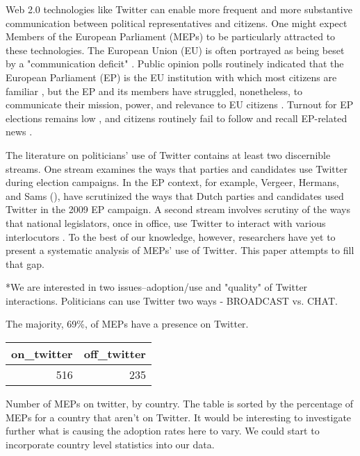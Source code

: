 \documentclass{article}\usepackage[]{graphicx}\usepackage[]{color}
\begin{document}
Web 2.0 technologies like Twitter can enable more frequent and more substantive communication between political representatives and citizens. One might expect Members of the European Parliament (MEPs) to be particularly attracted to these technologies. The European Union (EU) is often portrayed as being beset by a "communication deficit" \citep*{meyer.1999}.  Public opinion polls routinely indicated that the European Parliament (EP) is the EU institution with which most citizens are familiar \cite[e.g.,]{eurobarometer.2014}, but the EP and its members have struggled, nonetheless, to communicate their mission, power, and relevance to EU citizens \citep*{anderson.mcleod.2004}. Turnout for EP elections remains low \citep*{hobolt.2014, franklin.hobolt.2011, mattila.2013}, and citizens routinely fail to follow and recall EP-related news \citep*{eurobarometer.2013}.

The literature on politicians' use of Twitter contains at least two discernible streams. One stream examines the ways that parties and candidates use Twitter during election campaigns. In the EP context, for example, Vergeer, Hermans, and Sams (\citeyear{vergeer.hermans.sams.2011,vergeer.hermans.sams.2013}), have scrutinized the ways that Dutch parties and candidates used Twitter in the 2009 EP campaign. A second stream involves scrutiny of the ways that national legislators, once in office, use Twitter to interact with various interlocutors \citep*{ausserhofer.maireder.2013, chi.yang.2010, glass man.strauss.shogan.2013, larsson.kalsnes.2014, peterson.2012, shogun.2010, williams.gulati.2010}. To the best of our knowledge, however, researchers have yet to present a systematic analysis of MEPs' use of Twitter. This paper attempts to fill that gap.

*We are interested in two issues--adoption/use and "quality" of Twitter interactions. Politicians can use Twitter two ways - BROADCAST vs. CHAT.

The majority, 69\%, of MEPs have a presence on Twitter. 
\begin{table}[ht]
\centering
\begin{tabular}{rr}
  \hline
on\_twitter & off\_twitter \\ 
  \hline
516 & 235 \\ 
   \hline
\end{tabular}
\end{table}

Number of MEPs on twitter, by country. The table is sorted by the percentage of MEPs for a country that aren't on Twitter. It would be interesting to investigate further what is causing the adoption rates here to vary. We could start to incorporate country level statistics into our data.
\end{document}
